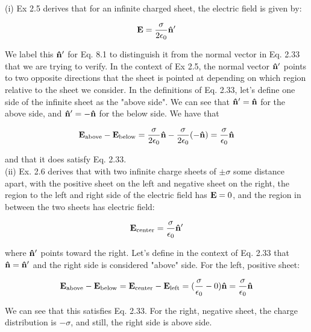 \documentclass{article}
\numberwithin{equation}{section}
\numberwithin{figure}{section}
\newcommand{\vbh}[1]{\vb{\hat{#1}}}
\begin{document}
(i) Ex 2.5 derives that for an infinite charged sheet, the electric field is given by:

\begin{equation}
    \vb E = \frac{\sigma}{2 \epsilon_0} \vbh n'
\end{equation}

We label this $\vbh n'$ for Eq. 8.1 to distinguish it from the normal vector in Eq. 2.33 that we are trying to verify. In the context of Ex 2.5, the normal vector $\vbh n'$ points to two opposite directions that the sheet is pointed at depending on which region relative to the sheet we consider. In the definitions of Eq. 2.33, let's define one side of the infinite sheet as the "above side". We can see that $\vbh n' = \vbh n$ for the above side, and $\vbh n' = - \vbh n$ for the below side. We have that

\begin{equation}
    \vb E_{\text{above}} - \vb E_{\text{below}} = \frac{\sigma}{2 \epsilon_0} \vbh n - \frac{\sigma}{2 \epsilon_0} (- \vbh n) =  \frac{\sigma}{\epsilon_0} \vbh n
\end{equation}

and that it does satisfy Eq. 2.33. \\

(ii) Ex. 2.6 derives that with two infinite charge sheets of $\pm\sigma$ some distance apart, with the positive sheet on the left and negative sheet on the right, the region to the left and right side of the electric field has $\vb E = 0$, and the region in between the two sheets has electric field:

\begin{equation}
    \vb E_{\text{center}} = \frac{\sigma}{\epsilon_0} \vbh n'
\end{equation}

where $\vbh n'$ points toward the right. Let's define in the context of Eq. 2.33 that $\vbh n = \vbh n'$ and the right side is considered "above" side. For the left, positive sheet:

\begin{equation}
    \vb E_{\text{above}} - \vb E_{\text{below}} = \vb E_{\text{center}} - \vb E_{\text{left}} = (\frac{\sigma}{\epsilon_0} - 0) \vbh n = \frac{\sigma}{\epsilon_0}\vbh n
\end{equation}

We can see that this satisfies Eq. 2.33. For the right, negative sheet, the charge distribution is $- \sigma$, and still, the right side is above side.
\end{document}
